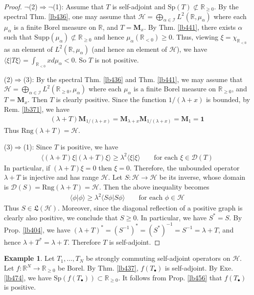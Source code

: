 \documentclass[12pt,b5paper,notitlepage]{article}
\theoremstyle{definition}
\newtheorem{eg}[df]{Example}
\theoremstyle{plain}
\newcommand{\fk}{\mathfrak}
\newcommand{\idt}{\mathbf{1}}
\newcommand{\Dom}{\mathscr{D}}
\newcommand{\bk}[1]{\langle {#1}\rangle}
\newcommand{\blt}{\bullet}
\newcommand{\Rbb}{\mathbb R}
\newcommand{\Sp}{\mathrm{Sp}}
\newcommand{\Rng}{\mathrm{Rng}}
\newcommand{\Supp}{\mathrm{Supp}}
\newcommand{\MH}{\mathcal H}
\newcommand{\SI}{\mathscr I}
\newcommand{\Mbf}{\mathbf M}
\numberwithin{equation}{section}
\begin{document}
\begin{proof}
$\neg$(2)$\Rightarrow$$\neg$(1): Assume that $T$ is self-adjoint and $\Sp(T)\nsubset\Rbb_{\geq0}$. By the spectral Thm. \ref{lb436}, one may assume that $\MH=\bigoplus_{\alpha\in\SI}L^2(\Rbb,\mu_\alpha)$ where each $\mu_\alpha$ is a finite Borel measure on $\Rbb$, and $T=\Mbf_x$. By Thm. \ref{lb441}, there exists $\alpha$ such that $\Supp(\mu_\alpha)\nsubset\Rbb_{\geq0}$ and hence $\mu_\alpha(\Rbb_{<0})\geq0$. Thus, viewing $\xi=\chi_{\Rbb_{<0}}$ as an element of $L^2(\Rbb,\mu_\alpha)$ (and hence an element of $\MH$), we have $\bk{\xi|T\xi}=\int_{\Rbb_{<0}}xd\mu_\alpha<0$. So $T$ is not positive.

(2)$\Rightarrow$(3): By the spectral Thm. \ref{lb436} and Thm. \ref{lb441}, we may assume that $\MH=\bigoplus_{\alpha\in\SI}L^2(\Rbb_{\geq0},\mu_\alpha)$ where each $\mu_\alpha$ is a finite Borel measure on $\Rbb_{\geq0}$, and $T=\Mbf_x$. Then $T$ is clearly positive. Since the function $1/(\lambda+x)$ is bounded, by Rem. \ref{lb371}, we have
\begin{align*}
(\lambda+T)\Mbf_{1/(\lambda+x)}=\Mbf_{\lambda+x}\Mbf_{1/(\lambda+x)}=\Mbf_1=\idt
\end{align*} 
Thus $\Rng(\lambda+T)=\MH$.

(3)$\Rightarrow$(1): Since $T$ is positive, we have
\begin{align*}
\bk{(\lambda+T)\xi|(\lambda+T)\xi}\geq \lambda^2\bk{\xi|\xi}\qquad\text{for each }\xi\in\Dom(T)
\end{align*}
In particular, if $(\lambda+T)\xi=0$ then $\xi=0$. Therefore, the unbounded operator $\lambda+T$ is injective and has range $\MH$. Let $S:\MH\rightarrow\MH$ be its inverse, whose domain is $\Dom(S)=\Rng(\lambda+T)=\MH$. Then the above inequality becomes
\begin{align*}
\bk{\phi|\phi}\geq\lambda^2\bk{S\phi|S\phi}\qquad\text{for each }\phi\in\MH
\end{align*}
Thus $S\in\fk L(\MH)$. Moreover, since the diagonal reflection of a positive graph is clearly also positive, we conclude that $S\geq0$. In particular, we have $S^*=S$. By Prop. \ref{lb404}, we have $(\lambda+T)^*=(S^{-1})^*=(S^*)^{-1}=S^{-1}=\lambda+T$, and hence $\lambda+T^*=\lambda+T$. Therefore $T$ is self-adjoint.
\end{proof}

\begin{eg}\label{lb475}
Let $T_1,\dots,T_N$ be strongly commuting self-adjoint operators on $\MH$. Let $f:\Rbb^N\rightarrow\Rbb_{\geq0}$ be Borel. By Thm. \ref{lb437}, $f(T_\blt)$ is self-adjoint. By Exe. \ref{lb474}, we have $\Sp(f(T_\blt))\subset\Rbb_{\geq0}$. It follows from Prop. \ref{lb456} that $f(T_\blt)$ is positive.
\end{eg}
\end{document}

